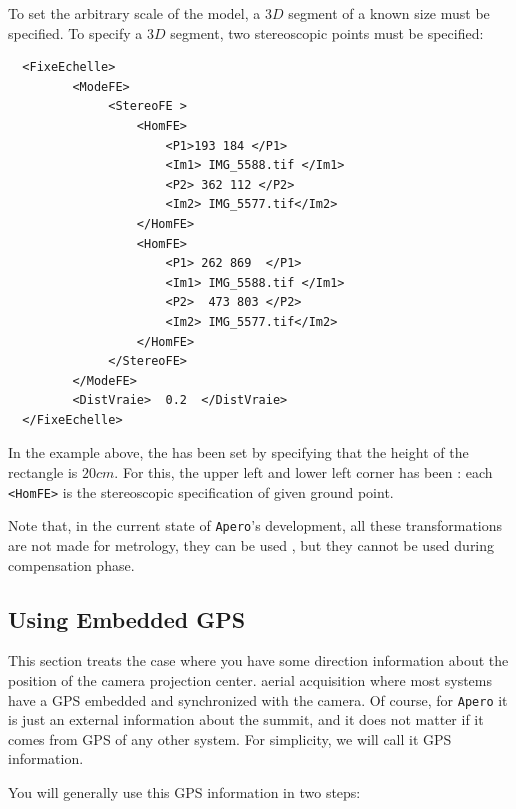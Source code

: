 To set the arbitrary scale of the model, a
$3D$ segment of a known size must be specified. To specify a $3D$ segment, 
two stereoscopic points must be specified:


{\scriptsize
\begin{verbatim}
  <FixeEchelle>
         <ModeFE>
              <StereoFE >
                  <HomFE>
                      <P1>193 184 </P1>
                      <Im1> IMG_5588.tif </Im1>
                      <P2> 362 112 </P2>
                      <Im2> IMG_5577.tif</Im2>
                  </HomFE>
                  <HomFE>
                      <P1> 262 869  </P1>
                      <Im1> IMG_5588.tif </Im1>
                      <P2>  473 803 </P2>
                      <Im2> IMG_5577.tif</Im2>
                  </HomFE>
              </StereoFE>
         </ModeFE>
         <DistVraie>  0.2  </DistVraie>
  </FixeEchelle>

\end{verbatim}
}

In the example above, the  %
 has been set by specifying that the
height of the rectangle is $20 cm$. For this, the upper left
and lower left corner has been : each  {\tt <HomFE>} is
the stereoscopic specification of given ground point.


Note that, in the current state of {\tt Apero}'s development, all these transformations
are not made for metrology, they can be used , but  they cannot be used during compensation phase.


\subsection{Using Embedded GPS}

This section treats the case where you have some direction information about
the position of the camera projection center.  aerial acquisition
where most systems have a GPS embedded and synchronized with the camera. Of course,
for {\tt Apero} it is just an external information about the summit, and it does not
matter if it comes from GPS of any other system. For simplicity, we will call it
GPS information.

You will generally use this GPS information in two steps:

